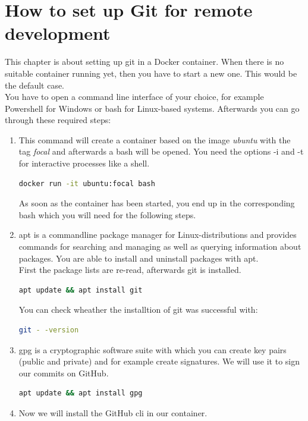 \chapter{How to set up Git for remote development}\label{chap:git_remote}
    This chapter is about setting up git in a Docker container. When there is no suitable container running yet, then you have to start a new one. This would be the default case. \\
    You have to open a command line interface of your choice, for example Powershell for Windows or \ac{bash} for Linux-based systems. 
    Afterwards you can go through these required steps: 
    \begin{enumerate}
        \item This command will create a container based on the image \textit{ubuntu} with the tag \textit{focal} and afterwards a \ac{bash} will be opened. You need the options -i and -t for interactive processes like a shell.
            \begin{lstlisting}[language=bash] 
docker run -it ubuntu:focal bash 
            \end{lstlisting}
        As soon as the container has been started, you end up in the corresponding \ac{bash} which you will need for the following steps.
        \item \ac{apt} is a commandline package manager for Linux-distributions and provides commands for searching and managing as well as querying information about packages. You are able to install and uninstall packages with \ac{apt}. \\
        First the package lists are re-read, afterwards git is installed. 
            \begin{lstlisting}[language=bash] 
apt update && apt install git
            \end{lstlisting}
            You can check wheather the installtion of git was successful with: 
            \begin{lstlisting}[language=bash] 
git - -version
            \end{lstlisting}
        \item \ac{gpg} is a cryptographic software suite with which you can create key pairs (public and private) and for example create signatures. We will use it to sign our commits on GitHub.
            \begin{lstlisting}[language=bash] 
apt update && apt install gpg
            \end{lstlisting}
        \item Now we will install the GitHub \ac{cli} in our container. \\

\end{enumerate}
